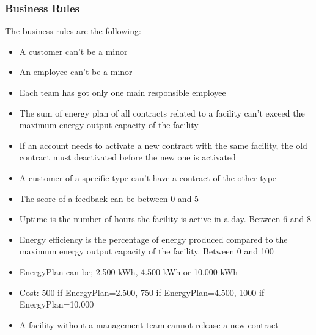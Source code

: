\subsubsection{Business Rules}
The business rules are the following:
\begin{itemize}
    \item A customer can't be a minor
    \item An employee can't be a minor
    \item Each team has got only one main responsible employee
    \item The sum of energy plan of all contracts related to a facility can't exceed the maximum energy output capacity of the facility
    \item If an account needs to activate a new contract with the same facility, the old contract must deactivated before the new one is activated
    \item A customer of a specific type can't have a contract of the other type
    \item The score of a feedback can be between 0 and 5
    \item Uptime is the number of hours the facility is active in a day. Between 6 and 8
    \item Energy efficiency is the percentage of energy produced compared to the maximum energy output capacity of the facility. Between 0 and 100
    \item EnergyPlan can be; 2.500 kWh, 4.500 kWh or 10.000 kWh
    \item Cost: 500 if EnergyPlan=2.500, 750 if EnergyPlan=4.500, 1000 if EnergyPlan=10.000
    \item A facility without a management team cannot release a new contract
\end{itemize}



